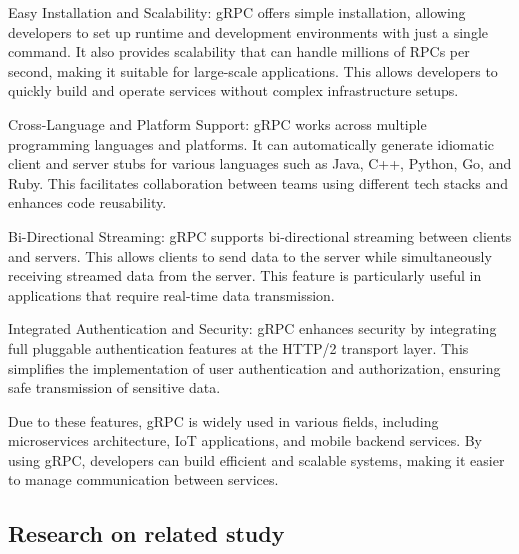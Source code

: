 \documentclass[conference]{IEEEtran}
\begin{document}
\begin{enumerate}[itemsep=2ex, parsep=1ex]
	      Easy Installation and Scalability: gRPC offers simple installation,
	      allowing developers to set up runtime and development environments with
	      just a single command. It also provides scalability that can handle millions
	      of RPCs per second, making it suitable for large-scale applications. This allows
	      developers to quickly build and operate services without complex infrastructure
	      setups.
	      	      	      
	      Cross-Language and Platform Support: gRPC works across multiple
	      programming languages and platforms. It can automatically generate idiomatic
	      client and server stubs for various languages such as Java, C++, Python,
	      Go, and Ruby. This facilitates collaboration between teams using different
	      tech stacks and enhances code reusability.
	      	      	      
	      Bi-Directional Streaming: gRPC supports bi-directional streaming between clients
	      and servers. This allows clients to send data to the server while
	      simultaneously receiving streamed data from the server. This feature is particularly
	      useful in applications that require real-time data transmission.
	      	      	      
	      Integrated Authentication and Security: gRPC enhances security by
	      integrating full pluggable authentication features at the HTTP/2 transport
	      layer. This simplifies the implementation of user authentication and authorization,
	      ensuring safe transmission of sensitive data.
	      	      	      
	      Due to these features, gRPC is widely used in various fields, including
	      microservices architecture, IoT applications, and mobile backend services.
	      By using gRPC, developers can build efficient and scalable systems, making
	      it easier to manage communication between services.
\end{enumerate}

\subsection{Research on related study}
\end{document}
